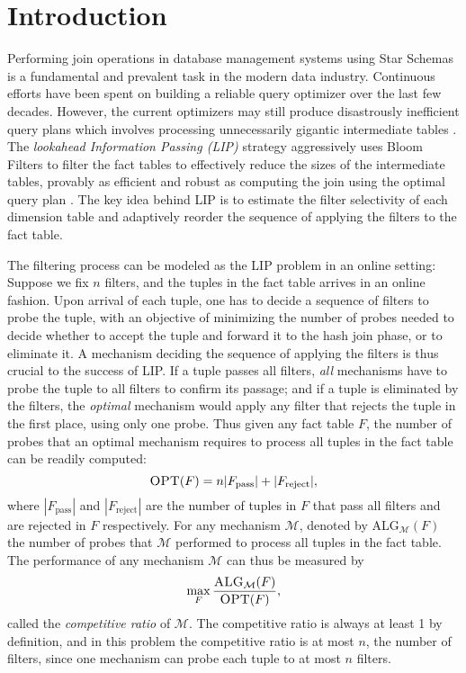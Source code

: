 
\section{Introduction}

Performing join operations in database management systems using Star Schemas is a fundamental and prevalent task in the modern data industry. Continuous efforts have been spent on building a reliable query optimizer over the last few decades. However, the current optimizers may still produce disastrously inefficient query plans which involves processing unnecessarily gigantic intermediate tables \cite{leis2015good,rabl2013variations}. The \textit{lookahead Information Passing (LIP)} strategy aggressively uses Bloom Filters to filter the fact tables to effectively reduce the sizes of the intermediate tables, provably as efficient and robust as computing the join using the optimal query plan \cite{zhu2017looking}. The key idea behind LIP is to estimate the filter selectivity of each dimension table and adaptively reorder the sequence of applying the filters to the fact table. 


The filtering process can be modeled as the \textsc{LIP} problem in an online setting: Suppose we fix $n$ filters, and the tuples in the fact table arrives in an online fashion. Upon arrival of each tuple, one has to decide a sequence of filters to probe the tuple, with an objective of minimizing the number of probes needed to decide whether to accept the tuple and forward it to the hash join phase, or to eliminate it. A mechanism deciding the sequence of applying the filters is thus crucial to the success of LIP. If a tuple passes all filters, \textit{all} mechanisms have to probe the tuple to all filters to confirm its passage; and if a tuple is eliminated by the filters, the \textit{optimal} mechanism would apply any filter that rejects the tuple in the first place, using only one probe. Thus given any fact table $F$, the number of probes that an optimal mechanism requires to process all tuples in the fact table can be readily computed: 
\[
	\textsc{OPT}(F) = n|F_{\text{pass}}| + |F_{\text{reject}}|,
\]
where $|F_{\text{pass}}|$ and $|F_{\text{reject}}|$ are the number of tuples in $F$ that pass all filters and are rejected in $F$ respectively. For any mechanism $\mathcal{M}$, denoted by \textsc{ALG}$_{\mathcal{M}}(F)$ the number of probes that $\mathcal{M}$ performed to process all tuples in the fact table.  The performance of any mechanism $\mathcal{M}$ can thus be measured by 
\[
	\max_{F}\frac{\textsc{ALG}_{\mathcal{M}}(F)}{\textsc{OPT}(F)},
\]
called the \textit{competitive ratio} of $\mathcal{M}$. The competitive ratio is always at least 1 by definition, and in this problem the competitive ratio is at most $n$, the number of filters, since one mechanism can probe each tuple to at most $n$ filters.


